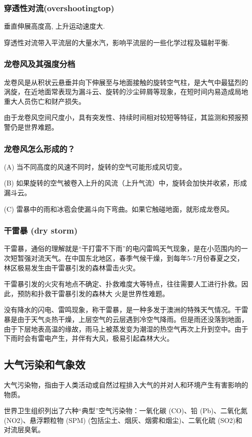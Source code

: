\documentclass[12pt,a4paper]{article}
\begin{document}
	\subsubsection{穿透性对流(overshootingtop)}
	垂直伸展高度高, 上升运动速度大.
	
	穿透性对流带入平流层的大量水汽，影响平流层的一些化学过程及辐射平衡.
	\subsubsection{龙卷风及其强度分档}
	龙卷风是从积状云悬垂并向下伸展至与地面接触的旋转空气柱，是大气中最猛烈的涡旋，在近地面常表现为漏斗云、旋转的沙尘碎屑等现象，在短时间内易造成局地重大人员伤亡和财产损失。
	
	由于龙卷风空间尺度小，具有突发性、持续时间相对较短等特征，其监测和预报预警仍是世界难题。
	
	\subsubsection{龙卷风怎么形成的？}
	(A) 当不同高度的风速不同时，旋转的空气可能形成风切变。
	
	(B) 如果旋转的空气被卷入上升的风流（上升气流）中，旋转会加快并收紧，形成漏斗云。
	
	(C) 雷暴中的雨和冰雹会使漏斗向下弯曲。如果它触碰地面，就形成龙卷风。
	\subsubsection{干雷暴 (dry storm)}
	干雷暴，通俗的理解就是“干打雷不下雨”的电闪雷鸣天气现象，是在小范围内的一次短暂强对流天气。在中国东北地区，春季气候干燥，到每年5-7月份春夏之交，林区极易发生由干雷暴引发的森林雷击火灾。
	
	干雷暴引发的火灾有地点不确定、扑救难度大等特点，往往需要人工进行扑救。因此，预防和扑救干雷暴引发的森林大
	火是世界性难题。
	
	没有降水的闪电、雷鸣现象，称干雷暴，是一种多发于澳洲的特殊天气情况。干雷暴是由于天气炎热干燥，上层空气的云层遇到冷空气降雨。但是雨还没落到地面，由于下层地表高温的缘故，雨马上被蒸发变为潮湿的热空气再次上升到空中。由于下雨时会有雷电产生，并伴有大风，极易引起森林大火。
	
	\subsection{大气污染和气象效}
	大气污染物，指由于人类活动或自然过程排入大气的并对人和环境产生有害影响的物质。
	
	世界卫生组织列出了六种“典型”空气污染物：一氧化碳 (CO)、铅 (Pb)、二氧化氮 (NO2)、悬浮颗粒物 (SPM) (包括尘土、烟灰、烟雾和烟尘)、二氧化硫 (SO2)和对流层臭氧。
	
\end{document}
